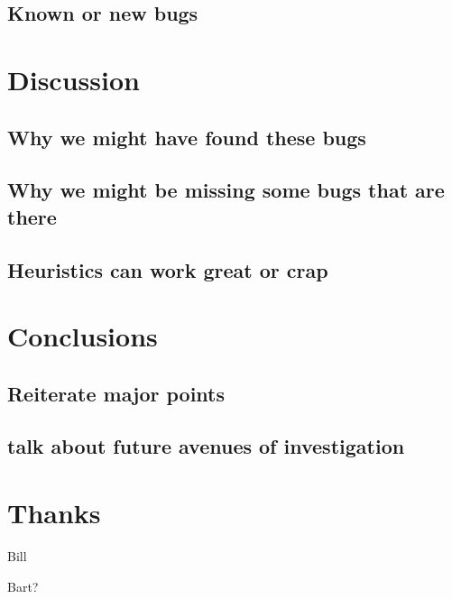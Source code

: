 \documentclass[10pt,]{article} %
\begin{document}
\subsection{Known or new bugs}


\section{Discussion}


\subsection{Why we might have found these bugs}

\subsection{Why we might be missing some bugs that are there}

\subsection{Heuristics can work great or crap}


\section{Conclusions}


\subsection{Reiterate major points}

\subsection{talk about future avenues of investigation}


\section{Thanks}


	Bill

	Bart?
\end{document}
